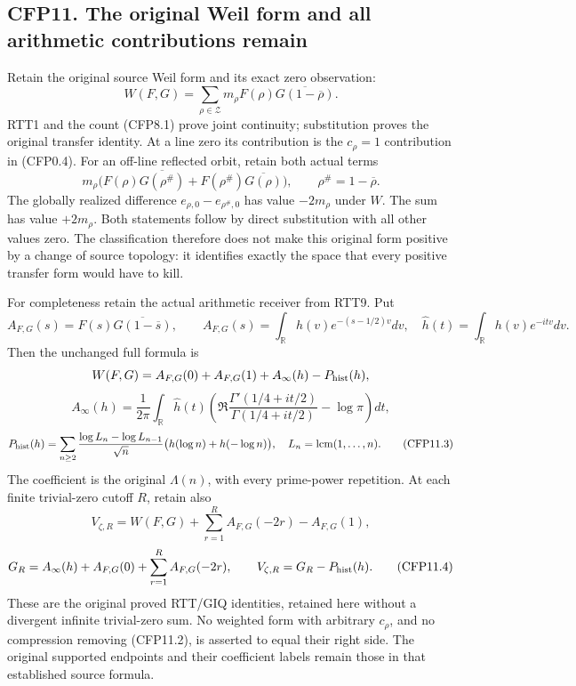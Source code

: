 \subsection{CFP11. The original Weil form and all arithmetic
contributions
remain}\label{cfp11.-the-original-weil-form-and-all-arithmetic-contributions-remain}

Retain the original source Weil form and its exact zero observation: \[
W(F,G)=\sum_{\rho\in\mathscr Z}m_\rho
F(\rho)\overline{G(1-\overline\rho)}.
\tag{CFP11.1}
\] RTT1 and the count (CFP8.1) prove joint continuity; substitution
proves the original transfer identity. At a line zero its contribution
is the \(c_\rho=1\) contribution in (CFP0.4). For an off-line reflected
orbit, retain both actual terms \[
m_\rho\bigl(F(\rho)\overline{G(\rho^\#)}
+F(\rho^\#)\overline{G(\rho)}\bigr),
\qquad \rho^\#=1-\overline\rho.
\tag{CFP11.2}
\] The globally realized difference \(e_{\rho,0}-e_{\rho^\#,0}\) has
value \(-2m_\rho\) under \(W\). The sum has value \(+2m_\rho\). Both
statements follow by direct substitution with all other values zero. The
classification therefore does not make this original form positive by a
change of source topology: it identifies exactly the space that every
positive transfer form would have to kill.

For completeness retain the actual arithmetic receiver from RTT9. Put \[
A_{F,G}(s)=F(s)\overline{G(1-\overline s)},\qquad
A_{F,G}(s)=\int_{\mathbb R}h(v)e^{-(s-1/2)v}dv,
\quad\widehat h(t)=\int_{\mathbb R}h(v)e^{-itv}dv.
\] Then the unchanged full formula is \[
W(F,G)=A_{F,G}(0)+A_{F,G}(1)+A_\infty(h)-P_{\rm hist}(h),
\] \[
A_\infty(h)=\frac1{2\pi}\int_{\mathbb R}\widehat h(t)
\left(\Re\frac{\Gamma'(1/4+it/2)}{\Gamma(1/4+it/2)}-\log\pi\right)dt,
\] \[
P_{\rm hist}(h)=\sum_{n\ge2}
\frac{\log L_n-\log L_{n-1}}{\sqrt n}
\bigl(h(\log n)+h(-\log n)\bigr),\quad
L_n=\operatorname{lcm}(1,\ldots,n).
\tag{CFP11.3}
\] The coefficient is the original \(\Lambda(n)\), with every
prime-power repetition. At each finite trivial-zero cutoff \(R\), retain
also \[
V_{\zeta,R}=W(F,G)+\sum_{r=1}^RA_{F,G}(-2r)-A_{F,G}(1),
\] \[
G_R=A_\infty(h)+A_{F,G}(0)+\sum_{r=1}^RA_{F,G}(-2r),
\qquad V_{\zeta,R}=G_R-P_{\rm hist}(h).
\tag{CFP11.4}
\] These are the original proved RTT/GIQ identities, retained here
without a divergent infinite trivial-zero sum. No weighted form with
arbitrary \(c_\rho\), and no compression removing (CFP11.2), is asserted
to equal their right side. The original supported endpoints and their
coefficient labels remain those in that established source formula.

